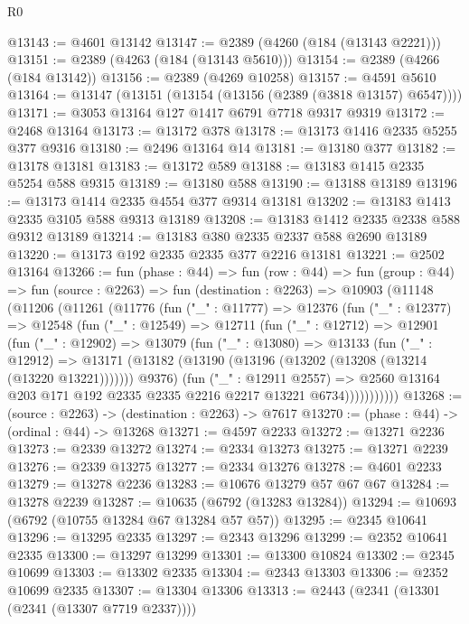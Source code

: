 \begin{lexlean}{R0}
\begin{coremodule}
@13143 := @4601 @13142
@13147 := @2389 (@4260 (@184 (@13143 @2221)))
@13151 := @2389 (@4263 (@184 (@13143 @5610)))
@13154 := @2389 (@4266 (@184 @13142))
@13156 := @2389 (@4269 @10258)
@13157 := @4591 @5610
@13164 := @13147 (@13151 (@13154 (@13156 (@2389 (@3818 @13157) @6547))))
@13171 := @3053 @13164 @127 @1417 @6791 @7718 @9317 @9319
@13172 := @2468 @13164
@13173 := @13172 @378
@13178 := @13173 @1416 @2335 @5255 @377 @9316
@13180 := @2496 @13164 @14
@13181 := @13180 @377
@13182 := @13178 @13181
@13183 := @13172 @589
@13188 := @13183 @1415 @2335 @5254 @588 @9315
@13189 := @13180 @588
@13190 := @13188 @13189
@13196 := @13173 @1414 @2335 @4554 @377 @9314 @13181
@13202 := @13183 @1413 @2335 @3105 @588 @9313 @13189
@13208 := @13183 @1412 @2335 @2338 @588 @9312 @13189
@13214 := @13183 @380 @2335 @2337 @588 @2690 @13189
@13220 := @13173 @192 @2335 @2335 @377 @2216 @13181
@13221 := @2502 @13164
@13266 := fun (phase : @44) =>
  fun (row : @44) =>
  fun (group : @44) =>
  fun (source : @2263) =>
  fun (destination : @2263) =>
  @10903
    (@11148
      (@11206
        (@11261
          (@11776
            (fun ("_" : @11777) =>
            @12376
              (fun ("_" : @12377) =>
              @12548
                (fun ("_" : @12549) =>
                @12711
                  (fun ("_" : @12712) =>
                  @12901
                    (fun ("_" : @12902) =>
                    @13079
                      (fun ("_" : @13080) =>
                      @13133
                        (fun ("_" : @12912) =>
                        @13171
                          (@13182 (@13190 (@13196 (@13202 (@13208 (@13214 (@13220 @13221)))))))
                          @9376)
                        (fun ("_" : @12911 @2557) =>
                        @2560 @13164 @203 @171 @192 @2335 @2335 @2216 @2217 @13221 @6734)))))))))))
@13268 := (source : @2263) -> (destination : @2263) -> @7617
@13270 := (phase : @44) -> (ordinal : @44) -> @13268
@13271 := @4597 @2233
@13272 := @13271 @2236
@13273 := @2339 @13272
@13274 := @2334 @13273
@13275 := @13271 @2239
@13276 := @2339 @13275
@13277 := @2334 @13276
@13278 := @4601 @2233
@13279 := @13278 @2236
@13283 := @10676 @13279 @57 @67 @67
@13284 := @13278 @2239
@13287 := @10635 (@6792 (@13283 @13284))
@13294 := @10693 (@6792 (@10755 @13284 @67 @13284 @57 @57))
@13295 := @2345 @10641
@13296 := @13295 @2335
@13297 := @2343 @13296
@13299 := @2352 @10641 @2335
@13300 := @13297 @13299
@13301 := @13300 @10824
@13302 := @2345 @10699
@13303 := @13302 @2335
@13304 := @2343 @13303
@13306 := @2352 @10699 @2335
@13307 := @13304 @13306
@13313 := @2443 (@2341 (@13301 (@2341 (@13307 @7719 @2337))))

\end{coremodule}
\end{lexlean}

